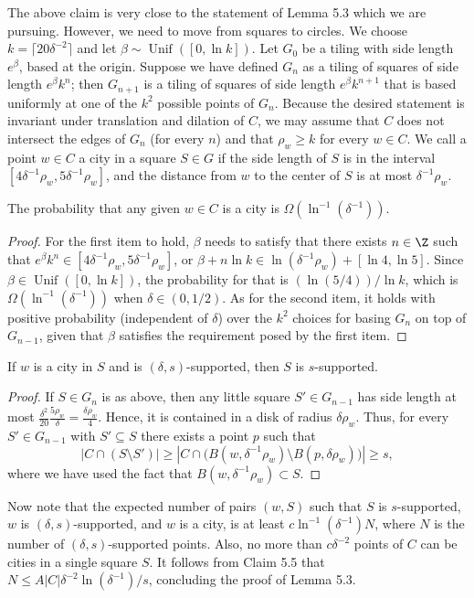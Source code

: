 The above claim is very close to the statement of Lemma 5.3 which we are pursuing. However, we need to move from squares to circles. We choose $k=\lceil20\delta^{-2}\rceil$ and let $\beta\sim\operatorname{Unif}([0,\ln k])$. Let $G_0$ be a tiling with side length $e^\beta$, based at the origin.
Suppose we have defined $G_n$ as a tiling of squares of side length $e^\beta k^n$; then $G_{n+1}$ is a tiling of squares of side length $e^\beta k^{n+1}$ that is based uniformly at one of the $k^2$ possible points of $G_n$. Because the desired statement is invariant under translation and dilation of $C$, we may assume that $C$ does not intersect the edges of $G_n$ (for every $n$) and that $\rho_w\ge k$ for every $w\in C$. We call a point $w\in C$ a city in a square $S\in G$ if the side length of $S$ is in the interval $[4\delta^{-1}\rho_w,5\delta^{-1}\rho_w]$, and the distance from $w$ to the center of $S$ is at most $\delta^{-1}\rho_w$.
\begin{claim}[5.6]
The probability that any given $w\in C$ is a city is $\Omega(\ln^{-1}(\delta^{-1}))$.
\end{claim}
\begin{proof}
For the first item to hold, $\beta$ needs to satisfy that there exists $n\in\Z$ such that $e^\beta k^n\in[4\delta^{-1}\rho_w,5\delta^{-1}\rho_w]$, or $\beta+n\ln k\in\ln(\delta^{-1}\rho_w)+[\ln4,\ln5]$. Since $\beta\in\operatorname{Unif}([0,\ln k])$, the probability for that is $(\ln(5/4))/\ln k$, which is $\Omega(\ln^{-1}(\delta^{-1}))$ when $\delta\in(0,1/2)$.
As for the second item, it holds with positive probability (independent of $\delta$) over the $k^2$ choices for basing $G_n$ on top of $G_{n-1}$, given that $\beta$ satisfies the requirement posed by the first item.
\end{proof}
\begin{claim}[5.7]
If $w$ is a city in $S$ and is $(\delta,s)$-supported, then $S$ is $s$-supported.
\end{claim}
\begin{proof}
If $S\in G_n$ is as above, then any little square $S'\in G_{n-1}$ has side length at most
$\frac{\delta^2}{20}\frac{5\rho_w}{\delta}=\frac{\delta\rho_w}{4}$.
Hence, it is contained in a disk of radius $\delta\rho_w$. Thus, for every $S'\in G_{n-1}$ with $S'\subseteq S$ there exists a point $p$ such that
\[
|C\cap(S\setminus S')|\ge\left|C\cap\bigl(B(w,\delta^{-1}\rho_w)\setminus B(p,\delta\rho_w)\bigr)\right|\ge s,
\]
where we have used the fact that $B(w,\delta^{-1}\rho_w)\subset S$.
\end{proof}
Now note that the expected number of pairs $(w,S)$ such that $S$ is $s$-supported, $w$ is $(\delta,s)$-supported, and $w$ is a city, is at least $c\ln^{-1}(\delta^{-1})N$, where $N$ is the number of $(\delta,s)$-supported points. Also, no more than $c\delta^{-2}$ points of $C$ can be cities in a single square $S$. It follows from Claim 5.5 that $N\le A|C|\delta^{-2}\ln(\delta^{-1})/s$, concluding the proof of Lemma 5.3.

